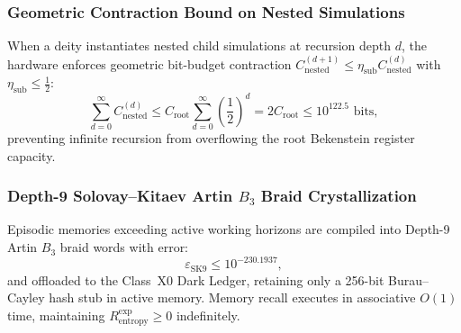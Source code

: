\documentclass[11pt,onecolumn]{article}
\begin{document}
\FloatBarrier
\begin{table}[!htbp]
\centering\small
\caption{Phase 6 Perpetual Fault Immunity and Mathematical Invariant Safeguards.}
\label{tab:fault_immunity}
\end{table}
\FloatBarrier

\subsubsection{Geometric Contraction Bound on Nested Simulations}
When a deity instantiates nested child simulations at recursion depth $d$, the hardware enforces geometric bit-budget contraction $C_{\text{nested}}^{(d+1)} \le \eta_{\text{sub}} C_{\text{nested}}^{(d)}$ with $\eta_{\text{sub}} \le \frac{1}{2}$:
\begin{equation}
\sum_{d=0}^\infty C_{\text{nested}}^{(d)} \le C_{\text{root}} \sum_{d=0}^\infty \left(\frac{1}{2}\right)^d = 2 C_{\text{root}} \le 10^{122.5}\text{ bits},
\end{equation}
preventing infinite recursion from overflowing the root Bekenstein register capacity.

\subsubsection{\texorpdfstring{Depth-9 Solovay--Kitaev Artin $B_3$ Braid Crystallization}{Depth-9 Solovay--Kitaev Artin B\_3 Braid Crystallization}}
Episodic memories exceeding active working horizons are compiled into Depth-9 Artin $B_3$ braid words with error:
\begin{equation}
\varepsilon_{\text{SK9}} \le 10^{-230.1937},
\end{equation}
and offloaded to the Class~X0 Dark Ledger, retaining only a 256-bit Burau--Cayley hash stub in active memory. Memory recall executes in associative $O(1)$ time, maintaining $R_{\text{entropy}}^{\text{exp}} \ge 0$ indefinitely.
\end{document}
